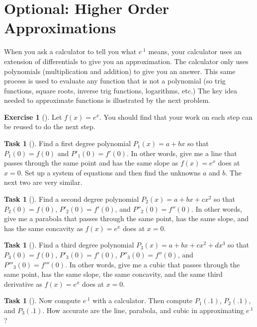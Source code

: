 \documentclass[10pt,]{book}
\theoremstyle{plain}
\theoremstyle{definition}
\theoremstyle{definition}
\theoremstyle{definition}
\theoremstyle{definition}
\newtheorem{exploration}[project]{Exercise}
\newtheorem{task}[project]{Task}
\theoremstyle{definition}
\numberwithin{equation}{section}
\begin{document}
\typeout{************************************************}
\typeout{************************************************}
\section[{Optional: Higher Order Approximations}]{Optional: Higher Order Approximations}\label{taylorseries}
When you ask a calculator to tell you what \(e^{.1}\) means, your calculator uses an extension of differentials to give you an approximation. The calculator only uses polynomials (multiplication and addition) to give you an answer. This same process is used to evaluate any function that is not a polynomial (so trig functions, square roots, inverse trig functions, logarithms, etc.) The key idea needed to approximate functions is illustrated by the next problem.%
\begin{exploration}[]\label{exploration-15}
Let \(f(x)=e^x\). You should find that your work on each step can be reused to do the next step.%
\begin{task}[]\label{task-18}
Find a first degree polynomial \(P_1(x)=a+bx\) so that \(P_1(0)=f(0)\) and \(P'_1(0)=f'(0)\). In other words, give me a line that passes through the same point and has the same slope as \(f(x)=e^x\) does at \(x=0\). Set up a system of equations and then find the unknowns \(a\) and \(b\). The next two are very similar.%
\end{task}
\begin{task}[]\label{task-19}
Find a second degree polynomial \(P_2(x)=a+bx+cx^2\) so that \(P_2(0)=f(0)\), \(P'_2(0)=f'(0)\), and \(P''_2(0)=f''(0)\). In other words, give me a parabola that passes through the same point, has the same slope, and has the same concavity as \(f(x)=e^x\) does at \(x=0\).%
\end{task}
\begin{task}[]\label{task-20}
Find a third degree polynomial \(P_3(x)=a+bx+cx^2+dx^3\) so that \(P_3(0)=f(0)\), \(P'_3(0)=f'(0)\), \(P''_3(0)=f''(0)\), and \(P'''_3(0)=f'''(0)\). In other words, give me a cubic that passes through the same point, has the same slope, the same concavity, and the same third derivative as \(f(x)=e^x\) does at \(x=0\).%
\end{task}
\begin{task}[]\label{task-21}
Now compute \(e^{.1}\) with a calculator.  Then compute \(P_1(.1)\), \(P_2(.1)\), and \(P_3(.1)\). How accurate are the line, parabola, and cubic in approximating \(e^{.1}\)?%
\end{task}
\end{exploration}
\end{document}
